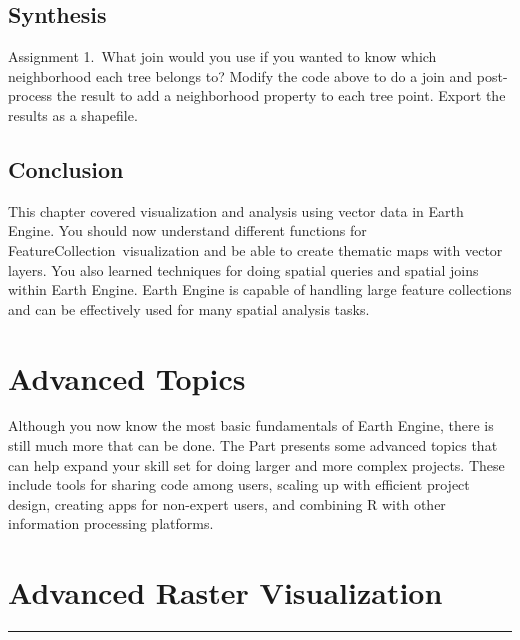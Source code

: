 \documentclass[
  letterpaper,
  DIV=11,
  numbers=noendperiod]{scrreprt}
\begin{document}
\hypertarget{synthesis-16}{%
\section*{Synthesis}\label{synthesis-16}}


Assignment 1.~What join would you use if you wanted to know which
neighborhood each tree belongs to? Modify the code above to do a join
and post-process the result to add a neighborhood property to each tree
point. Export the results as a shapefile.

\hypertarget{conclusion-20}{%
\section*{Conclusion}\label{conclusion-20}}


This chapter covered visualization and analysis using vector data in
Earth Engine. You should now understand different functions for
FeatureCollection~visualization and be able to create thematic maps with
vector layers. You also learned techniques for doing spatial queries and
spatial joins within Earth Engine. Earth Engine is capable of handling
large feature collections and can be effectively used for many spatial
analysis tasks.

\hypertarget{advanced-topics}{%
\chapter{Advanced Topics}\label{advanced-topics}}

Although you now know the most basic fundamentals of Earth Engine, there
is still much more that can be done. The Part presents some advanced
topics that can help expand your skill set for doing larger and more
complex projects. These include tools for sharing code among users,
scaling up with efficient project design, creating apps for non-expert
users, and combining R with other information processing platforms.

\hypertarget{advanced-raster-visualization}{%
\chapter{Advanced Raster
Visualization}\label{advanced-raster-visualization}}

\begin{center}\rule{0.5\linewidth}{0.5pt}\end{center}
\end{document}
